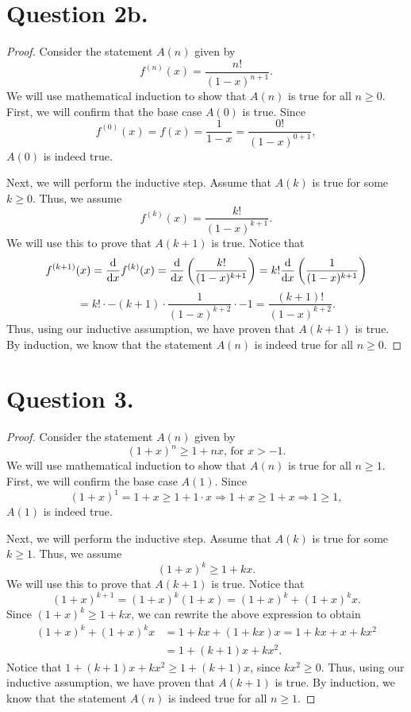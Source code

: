 \documentclass{article}
\begin{document}
\section*{Question 2b.}
\begin{proof}
    Consider the statement $ A(n) $ given by
    \[
        f^{(n)}(x) = \frac{n!}{(1 - x)^{n + 1}}.
    \]
    We will use mathematical induction to show that $ A(n) $ is true for all $ n \geq 0 $. First, we will confirm that the base case $ A(0) $ is true. Since
    \[
        f^{(0)}(x) = f(x) = \frac{1}{1 - x} = \frac{0!}{(1 - x)^{0 + 1}},
    \]
    $ A(0) $ is indeed true.

    \noindent Next, we will perform the inductive step. Assume that $ A(k) $ is true for some $ k \geq 0 $. Thus, we assume
    \[
        f^{(k)}(x) = \frac{k!}{(1 - x)^{k + 1}}.
    \]
    We will use this to prove that $ A(k + 1) $ is true. Notice that
    \[
        f^{(k+1)}(x) = \dv{x} f^{(k)} (x) = \dv{x} \left( \frac{k!}{(1 - x)^{k + 1}} \right) = k! \dv{x} \left( \frac{1}{(1 - x)^{k + 1}} \right)
    \]
    \[
        = k! \cdot -(k + 1) \cdot \frac{1}{(1 - x)^{k + 2}} \cdot -1 = \frac{(k + 1)!}{(1 - x)^{k + 2}}.
    \]
    Thus, using our inductive assumption, we have proven that $ A(k + 1) $ is true. By induction, we know that the statement $ A(n) $ is indeed true for all $ n \geq 0 $.
\end{proof}

\section*{Question 3.}
\begin{proof}
    Consider the statement $ A(n) $ given by
    \[
        (1 + x)^n \geq 1 + nx \mbox{, for } x > -1.
    \]
    We will use mathematical induction to show that $ A(n) $ is true for all $ n \geq 1 $. First, we will confirm the base case $ A(1) $. Since
    \[
        (1 + x)^1 = 1 + x \geq 1 + 1 \cdot x \Rightarrow 1 + x \geq 1 + x \Rightarrow 1 \geq 1,
    \]
    $ A(1) $ is indeed true.

    \noindent Next, we will perform the inductive step. Assume that $ A(k) $ is true for some $ k \geq 1 $. Thus, we assume
    \[
        (1 + x)^k \geq 1 + kx.
    \]
    We will use this to prove that $ A(k + 1) $ is true. Notice that
    \[
        (1 + x)^{k + 1} = (1 + x)^k (1 + x) = (1 + x)^k + (1 + x)^k x.
    \]
    Since $ (1 + x)^k \geq 1 + kx $, we can rewrite the above expression to obtain
    \begin{align*}
        (1 + x)^k + (1 + x)^k x &= 1 + kx + (1 + kx)x = 1 + kx + x + kx^2 \\
        &= 1 + (k + 1)x + kx^2.
    \end{align*}
    Notice that $ 1 + (k + 1)x + kx^2 \geq 1 + (k + 1)x $, since $ kx^2 \geq 0 $. Thus, using our inductive assumption, we have proven that $ A(k + 1) $ is true. By induction, we know that the statement $ A(n) $ is indeed true for all $ n \geq 1 $.
\end{proof}
\end{document}
